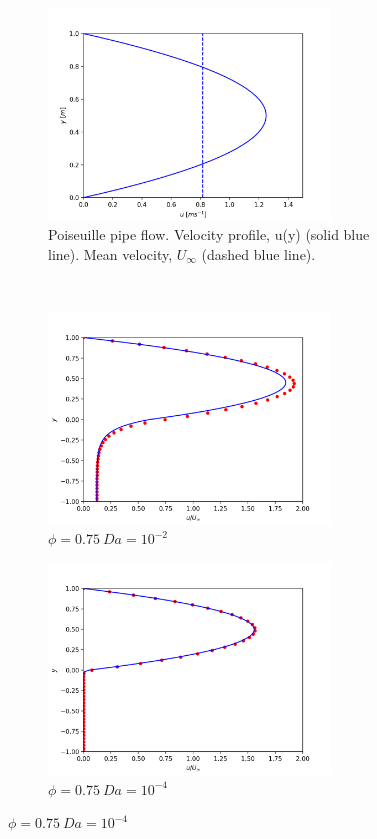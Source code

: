 \documentclass[a4paper,11pt]{report}
\begin{document}
\begin{figure}[ht]
    \centering
    \begin{subfigure}[b]{75mm}
        \includegraphics[width=75mm]{"channelFlow.png"}
        \caption{Poiseuille pipe flow. Velocity profile, u(y) (solid blue line). Mean velocity, $U_{\infty}$ (dashed blue line).}
        \label{fig:poiseuille_pipe_flow}
    \end{subfigure}
    \\
    \begin{subfigure}[b]{75mm}
        \includegraphics[width=75mm]{"pty0-75_Da1e-2.png"}
        \caption{$\phi=0.75\ Da=10^{-2}$}
        \label{fig:pty075_Da1e-2}
    \end{subfigure}
    \begin{subfigure}[b]{75mm}
        \includegraphics[width=75mm]{"pty0-75_Da1e-4.png"}
        \caption{$\phi=0.75\ Da=10^{-4}$}
        \label{fig:pty075_Da1e-4}

\end{subfigure}
\end{figure}
\end{document}
